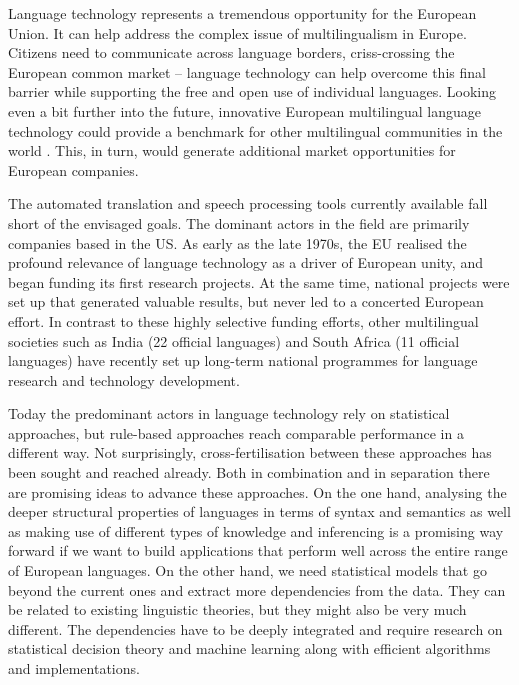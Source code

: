 \documentclass[10pt, plain]{../../metanetpaper}
\begin{document}
\begin{multicols}{2}
Language technology represents a tremendous opportunity for the European Union. It can help address the complex issue of multilingualism in Europe. Citizens need to communicate across language borders, criss-crossing the European common market -- language technology can help overcome this final barrier while supporting the free and open use of individual languages. Looking even a bit further into the future, innovative European multilingual language technology could provide a benchmark for other multilingual communities in the world \cite{maaya2012,ifa2008,ifa2011}. This, in turn, would generate additional market opportunities for European companies.

The automated translation and speech processing tools currently available fall short of the envisaged goals. The dominant actors in the field are primarily companies based in the US. As early as the late 1970s, the EU realised the profound relevance of language technology as a driver of European unity, and began funding its first research projects. At the same time, national projects were set up that generated valuable results, but never led to a concerted European effort. In contrast to these highly selective funding efforts, other multilingual societies such as India (22 official languages) and South Africa (11 official languages) have recently set up long-term national programmes for language research and technology development.

Today the predominant actors in language technology rely on statistical approaches, but rule-based approaches reach comparable performance in a different way. Not surprisingly, cross-fertilisation between these approaches has been sought and reached already. Both in combination and in separation there are promising ideas to advance these approaches. On the one hand, analysing the deeper structural properties of languages in terms of syntax and semantics as well as making use of different types of knowledge and inferencing is a promising way forward if we want to build applications that perform well across the entire range of European languages. On the other hand, we need statistical models that go beyond the current ones and extract more dependencies from the data. They can be related to existing linguistic theories, but they might also be very much different. The dependencies have to be deeply integrated and require research on statistical decision theory and machine learning along with efficient algorithms and implementations.


\end{multicols}
\end{document}
